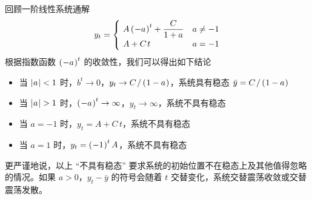 回顾一阶线性系统通解
\begin{equation*}
    y_t=\begin{cases}
        \ A\bka{-a}^{t}+\dfrac C{1+a} & a\neq -1\\
        \ A+C\,t & a=-1
    \end{cases}
\end{equation*}
根据指数函数 \(\left(\mspace{1mu}-a\mspace{1mu}\right)^t\) 的收敛性，我们可以得出如下结论
\begin{itemize}
    \item 当 \(\left|\mspace{1mu} a\mspace{1mu}\right|<1\) 时，\(b^t\to 0\)，\(y_t\to C\,/\bka{1-a}\)，系统具有稳态 \(\bar y = C\,/\bka
    {1-a}\)
    \item 当 \(\bkf{a}>1\) 时，\(\left(\mspace{1mu}-a\mspace{1mu}\right)^t\to \infty\)，\(y_t\to \infty\)，系统不具有稳态
    \item 当 \(a=-1\) 时，\(y_t=A+C\,t\)，系统不具有稳态
    \item 当 \(a=1\) 时，\(y_t=\left(\mspace{1mu}-1
    \mspace{1mu}\right)^tA\)，系统不具有稳态
\end{itemize}
更严谨地说，以上 “不具有稳态” 要求系统的初始位置不在稳态上及其他值得忽略的情况。如果 \(a>0\)，\(y_t-\bar y\) 的符号会随着 \(t\) 交替变化，系统交替震荡收敛或交替震荡发散。

\myskip
{}

